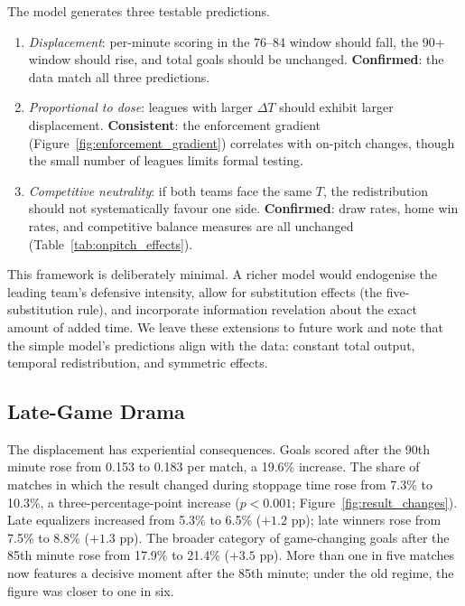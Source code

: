 The model generates three testable predictions.

\begin{enumerate}[nosep, leftmargin=*]
  \item \textit{Displacement}: per-minute scoring in the 76--84 window
  should fall, the 90+ window should rise, and total goals should be
  unchanged. \textbf{Confirmed}: the data match all three predictions.
  \item \textit{Proportional to dose}: leagues with larger $\Delta T$
  should exhibit larger displacement. \textbf{Consistent}: the
  enforcement gradient (Figure~\ref{fig:enforcement_gradient})
  correlates with on-pitch changes, though the small number of leagues
  limits formal testing.
  \item \textit{Competitive neutrality}: if both teams face the same
  $T$, the redistribution should not systematically favour one side.
  \textbf{Confirmed}: draw rates, home win rates, and competitive
  balance measures are all unchanged (Table~\ref{tab:onpitch_effects}).
\end{enumerate}

This framework is deliberately minimal. A richer model would endogenise
the leading team's defensive intensity, allow for substitution effects
(the five-substitution rule), and incorporate information revelation
about the exact amount of added time. We leave these extensions to
future work and note that the simple model's predictions align with
the data: constant total output, temporal redistribution, and
symmetric effects.


\subsection{Late-Game Drama}
\label{subsec:drama}

The displacement has experiential consequences. Goals scored after the
90th minute rose from 0.153 to 0.183 per match, a 19.6\% increase.
The share of matches in which the result changed during stoppage time
rose from 7.3\% to 10.3\%, a three-percentage-point increase
($p < 0.001$; Figure~\ref{fig:result_changes}). Late equalizers
increased from 5.3\% to 6.5\% ($+1.2$ pp); late winners rose from
7.5\% to 8.8\% ($+1.3$ pp). The broader category of game-changing
goals after the 85th minute rose from 17.9\% to 21.4\% ($+3.5$ pp).
More than one in five matches now features a decisive moment after the
85th minute; under the old regime, the figure was closer to one in six.

